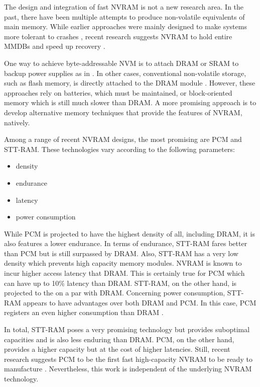 The design and integration of fast \ac{NVRAM} is not a new research area. In the
past, there have been multiple attempts to produce non-volatile equivalents of
main memory. While earlier approaches were mainly designed to make systems more
tolerant to crashes \cite{molina1992main}, recent research suggests \ac{NVRAM}
to hold entire \acp{MMDB} and speed up recovery \cite{oukid2015instant,
schwalb2016hyrise, andrei2017sap}.

One way to achieve byte-addressable \ac{NVM} is to attach \ac{DRAM} or \ac{SRAM}
to backup power supplies as in \cite{liskov1991replication, wang2002conquest}.
In other cases, conventional non-volatile storage, such as flash memory, is
directly attached to the \ac{DRAM} module \cite{shi2010write, huang2014design,
oe2016feasibility}. However, these approaches rely on batteries, which must be
maintained, or block-oriented memory which is still much slower than DRAM. A
more promising approach is to develop alternative memory techniques that provide
the features of \ac{NVRAM}, natively.

Among a range of recent \ac{NVRAM} designs, the most promising are \ac{PCM} and
\ac{STT-RAM}\cite{zilberberg2013phase, mittal2016survey, jain2017computing}.
These technologies vary according to the following parameters:

\begin{itemize}
    \item density
    \item endurance
    \item latency
    \item power consumption
\end{itemize}

While \ac{PCM} is projected to have the highest density of all, including
\ac{DRAM}, it is also features a lower endurance. In terms of endurance,
\ac{STT-RAM} fares better than \ac{PCM} but is still surpassed by \ac{DRAM}.
Also, \ac{STT-RAM} has a very low density which prevents high capacity memory
modules. \ac{NVRAM} is known to incur higher access latency that \ac{DRAM}. This
is certainly true for \ac{PCM} which can have up to 10\% latency than \ac{DRAM}.
\ac{STT-RAM}, on the other hand, is projected to the on a par with \ac{DRAM}.
Concerning power consumption, \ac{STT-RAM} appears to have advantages over both
\ac{DRAM} and \ac{PCM}. In this case, \ac{PCM} registers an even higher
consumption than \ac{DRAM} \cite{mittal2016survey}.

In total, \ac{STT-RAM} poses a very promising technology but provides suboptimal
capacities and is also less enduring than \ac{DRAM}. \ac{PCM}, on the other
hand, provides a higher capacity but at the cost of higher latencies. Still,
recent research suggests \ac{PCM} to be the first fast high-capacity \ac{NVRAM}
to be ready to manufacture \cite{zilberberg2013phase, dulloor2014system,
mittal2016survey}. Nevertheless, this work is independent of the underlying
NVRAM technology.


